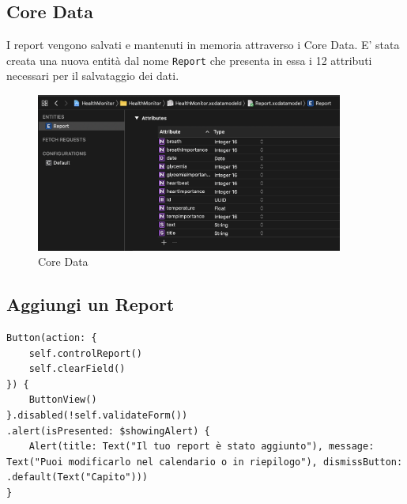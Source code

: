 \documentclass{article}
\begin{document}
\subsection{Core Data}

I report vengono salvati e mantenuti in memoria attraverso i Core Data. E' stata creata una nuova entità dal nome \texttt{Report} che presenta in essa i 12 attributi necessari per il salvataggio dei dati. 

\begin{figure}[htp]

\centering
\includegraphics[width=0.9\textwidth]{img/CoreData.png}


\caption{Core Data}
\label{fig:figure6}

\end{figure}

\subsection{Aggiungi un Report}

\begin{lstlisting}
Button(action: {
	self.controlReport()
	self.clearField()
}) {
	ButtonView()
}.disabled(!self.validateForm())
.alert(isPresented: $showingAlert) {
	Alert(title: Text("Il tuo report è stato aggiunto"), message: Text("Puoi modificarlo nel calendario o in riepilogo"), dismissButton: 		.default(Text("Capito")))
}
\end{lstlisting}
\end{document}

